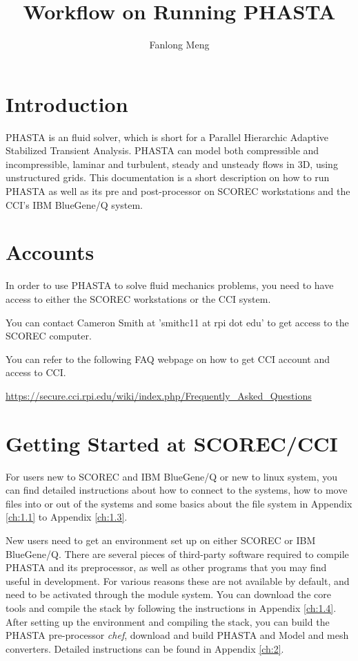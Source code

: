 \documentclass{article}
\title{Workflow on Running PHASTA}
\author{Fanlong Meng}
\begin{document}
\lstset{style=myc}

\maketitle

\section{Introduction}

PHASTA is an fluid solver, which is short for a Parallel Hierarchic Adaptive Stabilized Transient Analysis. PHASTA can model both compressible and incompressible, laminar and turbulent, steady and unsteady flows in 3D, using unstructured grids. This documentation is a short description on how to run PHASTA as well as its pre and post-processor on SCOREC workstations and the CCI's IBM BlueGene/Q system. 

\section{Accounts}

In order to use PHASTA to solve fluid mechanics problems, you need to have access to either the SCOREC workstations or the CCI system.

You can contact Cameron Smith at 'smithc11 at rpi dot edu' to get access to the SCOREC computer. 

You can refer to the following FAQ webpage on how to get CCI account and access to CCI.


\url{https://secure.cci.rpi.edu/wiki/index.php/Frequently_Asked_Questions}

\section{Getting Started at SCOREC/CCI}

For users new to SCOREC and IBM BlueGene/Q or new to linux system, you can find detailed instructions about how to connect to the systems, how to move files into or out of the systems and some basics about the file system in Appendix \ref{ch:1.1} to Appendix \ref{ch:1.3}.

New users need to get an environment set up on either SCOREC or IBM BlueGene/Q. There are several pieces of third-party software required to compile PHASTA and its preprocessor, as well as other programs that you may find useful in development. For various reasons these are not available by default, and need to be activated through the module system. You can download the core tools and compile the stack by following the instructions in Appendix \ref{ch:1.4}. After setting up the environment and compiling the stack, you can build the PHASTA pre-processor \textit{chef}, download and build PHASTA and Model and mesh converters. Detailed instructions can be found in Appendix \ref{ch:2}.
\end{document}
